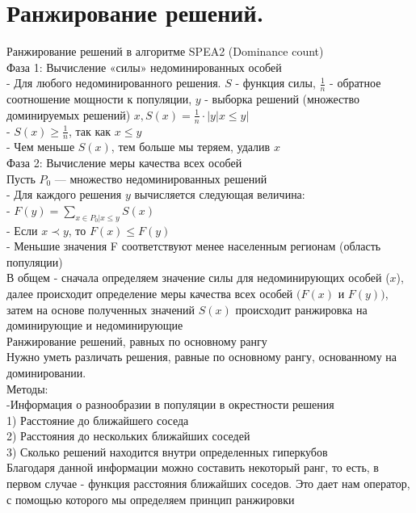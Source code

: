 \section{Ранжирование решений.}
Ранжирование решений в алгоритме SPEA2 (Dominance count)\\
Фаза 1: Вычисление «силы» недоминированных особей\\

- Для любого недоминированного решения. $S$ - функция силы, $\frac{1}{n}$ - обратное соотношение мощности к популяции, $y$ - выборка решений (множество доминируемых решений) $x, S(x) = \frac{1}{n}·|{y | x \leq y}|$\\
- $S(x) \geq \frac{1}{n}$, так как $x \leq y$\\
- Чем меньше $S(x)$, тем больше мы теряем, удалив $x$\\

Фаза 2: Вычисление меры качества всех особей\\
Пусть $P_{0}$ — множество недоминированных решений\\
- Для каждого решения $y$ вычисляется следующая величина:\\
- $F(y) = \sum_{x \in P_{0}|x \leq y} S(x)$\\
- Если $x \prec y$, то $F(x) \leq F(y)$\\
- Меньшие значения F соответствуют менее населенным регионам (область популяции)\\

В общем - сначала определяем значение силы для недоминирующих особей ($x$), далее происходит определение меры качества всех особей $(F(x)$ и $F(y))$, затем на основе полученных значений $S(x)$ происходит ранжировка на доминирующие и недоминирующие\\

Ранжирование решений, равных по основному рангу\\

Нужно уметь различать решения, равные по основному рангу,
основанному на доминировании.\\

Методы:\\
-Информация о разнообразии в популяции в окрестности решения\\
1) Расстояние до ближайшего соседа\\
2) Расстояния до нескольких ближайших соседей\\
3) Сколько решений находится внутри определенных гиперкубов\\
Благодаря данной информации можно составить некоторый ранг, то есть, в первом случае - функция расстояния ближайших соседов. Это дает нам оператор, с помощью которого мы определяем принцип ранжировки\\

